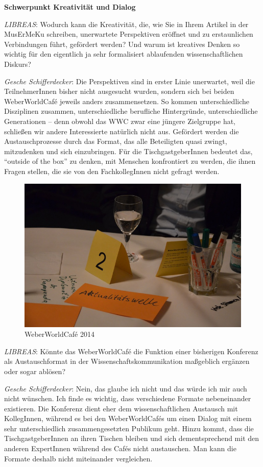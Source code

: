 \documentclass[a4paper,
fontsize=11pt,
oneside,
numbers=noperiodatend,
parskip=half-,
bibliography=totoc,
final
]{scrartcl}
\begin{document}
\textbf{Schwerpunkt Kreativität und Dialog}

\emph{LIBREAS}: Wodurch kann die Kreativität, die, wie Sie in Ihrem
Artikel in der MusErMeKu schreiben, unerwartete Perspektiven eröffnet
und zu erstaunlichen Verbindungen führt, gefördert werden? Und warum ist
kreatives Denken so wichtig für den eigentlich ja sehr formalisiert
ablaufenden wissenschaftlichen Diskurs?

\emph{Gesche Schifferdecker}: Die Perspektiven sind in erster Linie
unerwartet, weil die TeilnehmerInnen bisher nicht ausgesucht wurden,
sondern sich bei beiden WeberWorldCafé jeweils anders zusammensetzen. So
kommen unterschiedliche Disziplinen zusammen, unterschiedliche
berufliche Hintergründe, unterschiedliche Generationen -- denn obwohl
das WWC zwar eine jüngere Zielgruppe hat, schließen wir andere
Interessierte natürlich nicht aus. Gefördert werden die
Austauschprozesse durch das Format, das alle Beteiligten quasi zwingt,
mitzudenken und sich einzubringen. Für die TischgastgeberInnen bedeutet
das, \enquote{outside of the box} zu denken, mit Menschen konfrontiert
zu werden, die ihnen Fragen stellen, die sie von den FachkollegInnen
nicht gefragt werden.

\begin{figure}[htbp]
\centering
\includegraphics{wwc2.jpg}
\caption{WeberWorldCafé 2014}
\end{figure}

\emph{LIBREAS}: Könnte das WeberWorldCafé die Funktion einer bisherigen
Konferenz als Austauschformat in der Wissenschaftskommunikation
maßgeblich ergänzen oder sogar ablösen?

\emph{Gesche Schifferdecker}: Nein, das glaube ich nicht und das würde
ich mir auch nicht wünschen. Ich finde es wichtig, dass verschiedene
Formate nebeneinander existieren. Die Konferenz dient eher dem
wissenschaftlichen Austausch mit KollegInnen, während es bei den
WeberWorldCafés um einen Dialog mit einem sehr unterschiedlich
zusammengesetzten Publikum geht. Hinzu kommt, dass die
TischgastgeberInnen an ihren Tischen bleiben und sich dementsprechend
mit den anderen ExpertInnen während des Cafés nicht austauschen. Man
kann die Formate deshalb nicht miteinander vergleichen.
\end{document}
